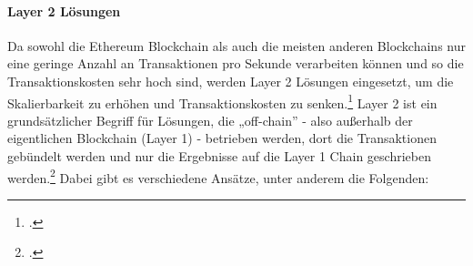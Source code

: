 \paragraph{Layer 2 Lösungen}
\label{sec:definition-layer-2-solutions}

Da sowohl die Ethereum Blockchain als auch die meisten anderen Blockchains nur eine geringe Anzahl an Transaktionen pro Sekunde verarbeiten können und so die Transaktionskosten sehr hoch sind, werden Layer 2 Lösungen eingesetzt, um die Skalierbarkeit zu erhöhen und Transaktionskosten zu senken.\footcite[Vgl.][]{w17}
Layer 2 ist ein grundsätzlicher Begriff für Lösungen, die „off-chain” - also außerhalb der eigentlichen Blockchain (Layer 1) - betrieben werden, dort die Transaktionen gebündelt werden und nur die Ergebnisse auf die Layer 1 Chain geschrieben werden.\footcite[Vgl.][]{w18}
Dabei gibt es verschiedene Ansätze, unter anderem die Folgenden:

